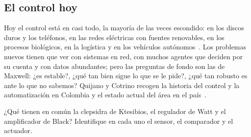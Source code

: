 \subsection{El control hoy}

Hoy el control está en casi todo, la mayoría de las veces escondido: en los discos duros y los teléfonos, en las redes eléctricas con fuentes renovables, en los procesos biológicos, en la logística y en los vehículos autónomos~\citep{AsKu14}. Los problemas nuevos tienen que ver con sistemas en red, con muchos agentes que deciden por su cuenta y con datos abundantes; pero las preguntas de fondo son las de Maxwell: ¿es estable?, ¿qué tan bien sigue lo que se le pide?, ¿qué tan robusto es ante lo que no sabemos? Quijano y Cotrino recogen la historia del control y la automatización en Colombia y el estado actual del área en el país~\citep{QuCo23}.

\begin{pausa}
¿Qué tienen en común la clepsidra de Ktesibios, el regulador de Watt y el amplificador de Black? Identifique en cada uno el sensor, el comparador y el actuador.
\end{pausa}
